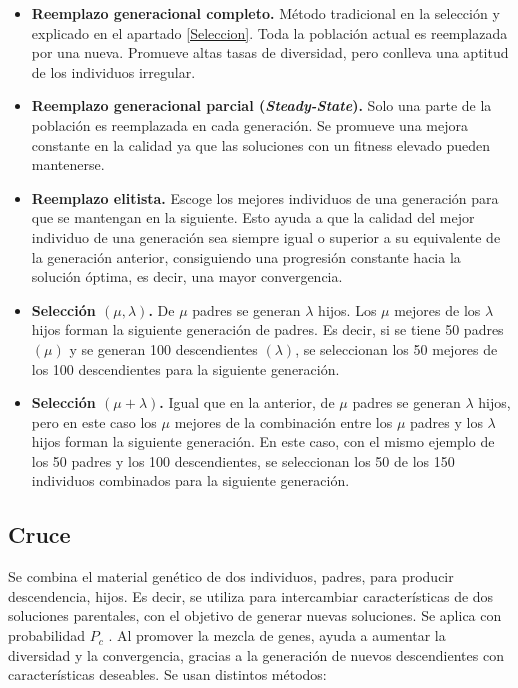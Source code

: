 \begin{itemize}
  \item \textbf{Reemplazo generacional completo.} Método tradicional en la selección y explicado en el apartado \ref{Seleccion}. Toda la población actual es reemplazada por una nueva. Promueve altas tasas de diversidad, pero conlleva una aptitud de los individuos irregular.
  \item \textbf{Reemplazo generacional parcial (\textit{Steady-State}).} Solo una parte de la población es reemplazada en cada generación. Se promueve una mejora constante en la calidad ya que las soluciones con un fitness elevado pueden mantenerse.
  \item \textbf{Reemplazo elitista.} Escoge los mejores individuos de una generación para que se mantengan en la siguiente. Esto ayuda a que la calidad del mejor individuo de una generación sea siempre igual o superior a su equivalente de la generación anterior, consiguiendo una progresión constante hacia la solución óptima, es decir, una mayor convergencia.
  \item \textbf{Selección $(\mu,\lambda)$.} De $\mu$ padres se generan $\lambda$ hijos. Los $\mu$ mejores de los $\lambda$ hijos forman la siguiente generación de padres. Es decir, si se tiene 50 padres $(\mu)$ y se generan 100 descendientes $(\lambda)$, se seleccionan los 50 mejores de los 100 descendientes para la siguiente generación.
  \item \textbf{Selección $(\mu+\lambda)$.} Igual que en la anterior, de $\mu$ padres se generan $\lambda$ hijos, pero en este caso los $\mu$ mejores de la combinación entre los $\mu$ padres y los $\lambda$ hijos forman la siguiente generación. En este caso, con el mismo ejemplo de los 50 padres y los 100 descendientes, se seleccionan los 50 de los 150 individuos combinados para la siguiente generación.
\end{itemize}

\subsection{Cruce}

Se combina el material genético de dos individuos, padres, para producir descendencia, hijos. Es decir, se utiliza para intercambiar características de dos soluciones parentales, con el objetivo de generar nuevas soluciones. Se aplica con probabilidad \(P_c\) . Al promover la mezcla de genes, ayuda a aumentar la diversidad y la convergencia, gracias a la generación de nuevos descendientes con características deseables. Se usan distintos métodos:

